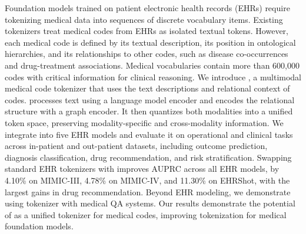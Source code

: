 
Foundation models trained on patient electronic health records (EHRs) require tokenizing medical data into sequences of discrete vocabulary items. Existing tokenizers treat medical codes from EHRs as isolated textual tokens. However, each medical code is defined by its textual description, its position in ontological hierarchies, and its relationships to other codes, such as disease co-occurrences and drug-treatment associations. Medical vocabularies contain more than 600,000 codes with critical information for clinical reasoning.  
%
We introduce \model, a multimodal medical code tokenizer that uses the text descriptions and relational context of codes. \model processes text using a language model encoder and encodes the relational structure with a graph encoder. It then quantizes both modalities into a unified token space, preserving modality-specific and cross-modality information.  
%
We integrate \model into five EHR models and evaluate it on operational and clinical tasks across in-patient and out-patient datasets, including outcome prediction, diagnosis classification, drug recommendation, and risk stratification. Swapping standard EHR tokenizers with \model improves AUPRC across all EHR models, by 4.10\% on MIMIC-III, 4.78\% on MIMIC-IV, and 11.30\% on EHRShot, with the largest gains in drug recommendation. Beyond EHR modeling, we demonstrate using \model tokenizer with medical QA systems. 
%
Our results demonstrate the potential of \model as a unified tokenizer for medical codes, improving tokenization for medical foundation models.